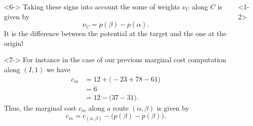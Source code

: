 \documentclass[32pt,aspectratio=169]{beamer}
\begin{document}
\begin{frame}
\begin{columns}
\begin{column}{.6\textwidth}
\begin{overlayarea}{\textwidth}{.78\textheight}
\begin{onlyenv}
          \begin{uncoverenv}<6->
            \vspace{.5\baselineskip}
            Taking these signs into account the some of weights $\nu_C$
            along $C$ is given by
            \begin{displaymath}
              \nu_C = p(\beta) - p(\alpha).
            \end{displaymath}
            It is the difference between the potential at the target and
            the one at the origin!
          \end{uncoverenv}
        \end{onlyenv}
        \begin{onlyenv}<7-> 
          \vspace{.5\baselineskip}
          For instance in the case of our previous marginal cost
          computation along $(I, 1)$ we have
          \begin{align*}
            c_m & = 12 + \big(-23 + 78 - 61\big) \\ 
                & = 6 \\ 
                & = 12 - \big( 37 - 31\big). 
          \end{align*}
          Thus, the marginal cost $c_m$ along a route
          $(\alpha, \beta)$ is given by 
          \begin{displaymath}
            c_m = c_{(\alpha, \beta)} - \big(p(\beta) - p(\beta)\big).
          \end{displaymath}
        \end{onlyenv}
      \end{overlayarea}
    \end{column}
    \begin{column}{.4\textwidth}
      \begin{overlayarea}{\textwidth}{.78\textheight}
        \begin{onlyenv}<1-2>
\end{onlyenv}
\end{overlayarea}
\end{column}
\end{columns}
\end{frame}
\end{document}
